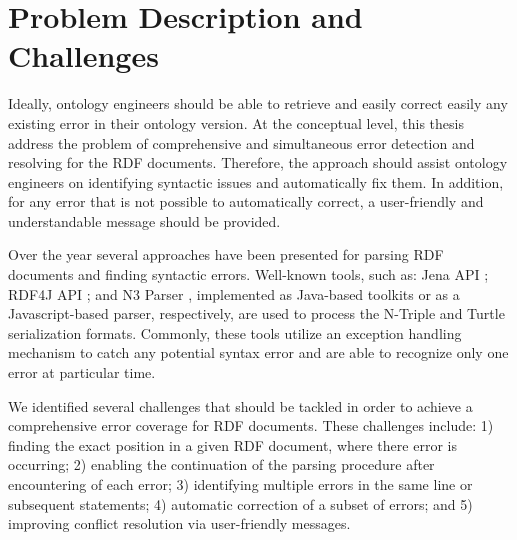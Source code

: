 \section{Problem Description and Challenges} 	
Ideally, ontology engineers should be able to retrieve and easily correct easily any existing error in their ontology version.
At the conceptual level, this thesis address the problem of comprehensive and simultaneous error detection and resolving for the RDF documents.
Therefore, the approach should assist ontology engineers on identifying syntactic issues and automatically fix them.
In addition, for any error that is not possible to automatically correct, a user-friendly and understandable message should be provided.

Over the year several approaches have been presented for parsing RDF documents and finding syntactic errors.
Well-known tools, such as: Jena API \cite{McBride:2002:JSW:613357.613755}; RDF4J API \cite{RDF4J:Online}; and N3 Parser \cite{N3Parser:Online}, implemented as Java-based toolkits or as a Javascript-based parser, respectively, are used to process the N-Triple and Turtle serialization formats. 
Commonly, these tools utilize an exception handling mechanism to catch any potential syntax error and are able to recognize only one error at particular time.

We identified several challenges that should be tackled in order to achieve a comprehensive error coverage for RDF documents.
These challenges include: 1) finding the exact position in a given RDF document, where there error is occurring; 2) enabling the continuation of the parsing procedure after encountering of each error; 3) identifying multiple errors in the same line or subsequent statements; 4) automatic correction of a subset of errors; and 5) improving conflict resolution via user-friendly messages.


